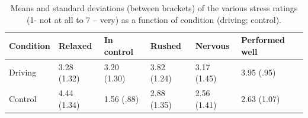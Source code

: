 \documentclass[authordate, empirical]{jote-new-article}
\begin{document}
\begin{table}[t]
  \begin{fullwidth}
    \caption{Means and standard deviations (between brackets) of the various stress ratings (1- not at all to 7 – very) as a function of condition (driving; control).}
    \label{tab:tab3}
    \begin{tabularx}{\textwidth}{@{} X X X X X X  @{}}
      \toprule
      \textbf{Condition} & \textbf{Relaxed}
                         & \textbf{In control} & \textbf{Rushed}
                         & \textbf{Nervous}    & \textbf{Performed well}

      \\
      \midrule

      Driving            & 3.28 (1.32)         & 3.20 (1.30)             & 3.82 (1.24) & 3.17 (1.45)
                         & 3.95 (.95)                                                                \\

      Control            & 4.44 (1.34)         & 1.56 (.88)              & 2.88 (1.35) & 2.56 (1.41)
                         & 2.63 (1.07)                                                               \\
      \bottomrule
    \end{tabularx}
  \end{fullwidth}
\end{table}
\end{document}
